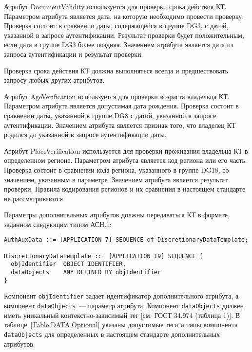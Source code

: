 Атрибут DocumentValidity используется для проверки срока действия КТ. 
Параметром атрибута является дата, на которую необходимо провести 
проверку. Проверка состоит в сравнении даты, содержащейся в группе DG3, с 
датой, указанной в запросе аутентификации. Результат проверки будет 
положительным, если дата в группе DG3 более поздняя. Значением атрибута 
является дата из запроса аутентификации и результат проверки. 

Проверка срока действия КТ должна выполняться всегда и предшествовать 
запросу любых других атрибутов. 

Атрибут AgeVerification используется для проверки возраста владельца КТ. 
Параметром атрибута является допустимая дата рождения. Проверка состоит в 
сравнении даты, указанной в группе DG8 с датой, указанной в запросе 
аутентификации. Значением атрибута является признак того, что владелец КТ 
родился до указанной в запросе аутентификации даты. 

Атрибут PlaceVerification используется для проверки проживания владельца 
КТ в определенном регионе. Параметром атрибута является код региона или 
его часть. Проверка состоит в сравнении кода региона, указанного в группе 
DG18, со значением, указанным в параметре. Значением атрибута является 
результат проверки. Правила кодирования регионов и их сравнения в 
настоящем стандарте не рассматриваются. 

Параметры дополнительных атрибутов должны передаваться КТ в формате, 
заданном следующим типом АСН.1: 

\begin{verbatim}
AuthAuxData ::= [APPLICATION 7] SEQUENCE of DiscretionaryDataTemplate;

DiscretionaryDataTemplate ::= [APPLICATION 19] SEQUENCE {
  objIdentifier  OBJECT IDENTIFIER,
  dataObjects    ANY DEFINED BY objIdentifier
}
\end{verbatim}

Компонент \verb|objIdentifier| задает идентификатор дополнительного атрибута, 
а компонент \verb|dataObjects|~--– параметр атрибута. 
Компонент \verb|dataObjects| должен иметь уникальный контекстно-зависимый тег 
[см. ГОСТ 34.974 (таблица 1)]. 
В таблице~\ref{Table.DATA.Optional} указаны допустимые теги и типы 
компонента \verb|dataObjects| для определенных в настоящем стандарте 
дополнительных атрибутов.  

